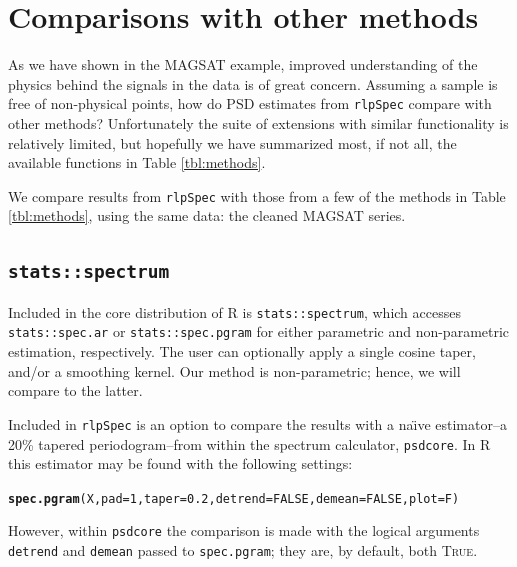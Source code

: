 \documentclass{article}\usepackage{graphicx, color}
\makeatletter
\newcommand{\hlfunctioncall}[1]{\textcolor[rgb]{0.501960784313725,0,0.329411764705882}{\textbf{#1}}}%
\newenvironment{kframe}{%
 \def\at@end@of@kframe{}%
 \ifinner\ifhmode%
  \def\at@end@of@kframe{\end{minipage}}%
  \begin{minipage}{\columnwidth}%
 \fi\fi%
 \def\FrameCommand##1{\hskip\@totalleftmargin \hskip-\fboxsep
 \colorbox{shadecolor}{##1}\hskip-\fboxsep
     \hskip-\linewidth \hskip-\@totalleftmargin \hskip\columnwidth}%
 \MakeFramed {\advance\hsize-\width
   \@totalleftmargin\z@ \linewidth\hsize
   \@setminipage}}%
 {\par\unskip\endMakeFramed%
 \at@end@of@kframe}
\newenvironment{knitrout}{}{} %
\newcommand{\SC}[1]{\textsc{#1}}
\newcommand{\Rcmd}[1]{\texttt{#1}}
\newcommand{\rlp}[0]{\Rcmd{rlpSpec}}
\newcommand{\naive}[0]{na\"{\i}ve}
\makeatother
\begin{document}
\section{Comparisons with other methods}

As we have shown in the MAGSAT example, 
improved understanding of the physics behind the signals in the data
is of great concern.
Assuming a sample is free of non-physical points, how do
PSD estimates from \rlp{}
compare with other methods?
Unfortunately the suite of extensions with similar functionality
is relatively limited, but hopefully we have
summarized most, if not all, the available functions in Table \ref{tbl:methods}.



We compare results from
\rlp{} with those from a few of the methods in Table \ref{tbl:methods},
using the same data: the cleaned MAGSAT series.

\subsection{\Rcmd{stats::spectrum}}

Included in the core distribution of R is \Rcmd{stats::spectrum}, which
accesses \Rcmd{stats::spec.ar} or \Rcmd{stats::spec.pgram} for either
parametric and non-parametric estimation, respectively.  
The user can optionally apply a single cosine taper, and/or a smoothing kernel.
Our method is non-parametric; hence, we will compare to the latter.

Included in \rlp{} is an option to compare the 
results with a \naive{} estimator--a 20\% tapered periodogram--from within the
spectrum calculator, \Rcmd{psdcore}.
In R this estimator may be found with the following settings:
%
\begin{knitrout}
\color{fgcolor}\begin{kframe}
\begin{alltt}
\hlfunctioncall{spec.pgram}(X, pad = 1, taper = 0.2, detrend = FALSE, demean = FALSE, plot = F)
\end{alltt}
\end{kframe}
\end{knitrout}

However, within \Rcmd{psdcore} the comparison is
made with
the logical arguments \Rcmd{detrend} and \Rcmd{demean} 
passed to \Rcmd{spec.pgram}; they are,
by default, both \SC{True}.
\end{document}
